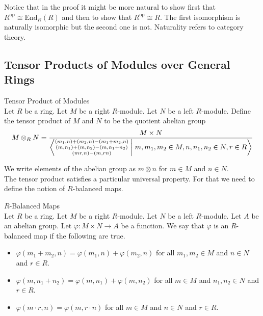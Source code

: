 \documentclass[a4paper]{article}
\begin{document}
Notice that in the proof it might be more natural to show first that $R^\text{op}\cong\text{End}_R(R)$ and then to show that $R^\text{op}\cong R$. The first isomorphism is naturally isomorphic but the second one is not. Naturality refers to category theory. 

\subsection{Tensor Products of Modules over General Rings}
\begin{defn}{Tensor Product of Modules}{}\\
Let $R$ be a ring. Let $M$ be a right $R$-module. Let $N$ be a left $R$-module. Define the tensor product of $M$ and $N$ to be the quotient abelian group $$M\otimes_RN=\frac{M\times N}{\left\langle\substack{(m_1,n)+(m_2,n)-(m_1+m_2,n)\\(m,n_1)+(m,n_2)-(m,n_1+n_2)\\(mr,n)-(m,rn)}\;\bigg{|}\;m,m_1,m_2\in M,n,n_1,n_2\in N,r\in R\right\rangle}$$
\end{defn}

We write elements of the abelian group as $m\otimes n$ for $m\in M$ and $n\in N$. \\

The tensor product satisfies a particular universal property. For that we need to define the notion of $R$-balanced maps. 

\begin{defn}{$R$-Balanced Maps}{}\\
Let $R$ be a ring. Let $M$ be a right $R$-module. Let $N$ be a left $R$-module. Let $A$ be an abelian group. Let $\varphi:M\times N\to A$ be a function. We say that $\varphi$ is an $R$-balanced map if the following are true. 
\begin{itemize}
\item $\varphi(m_1+m_2,n)=\varphi(m_1,n)+\varphi(m_2,n)$ for all $m_1,m_2\in M$ and $n\in N$ and $r\in R$. 
\item $\varphi(m,n_1+n_2)=\varphi(m,n_1)+\varphi(m,n_2)$ for all $m\in M$ and $n_1,n_2\in N$ and $r\in R$. 
\item $\varphi(m\cdot r,n)=\varphi(m,r\cdot n)$ for all $m\in M$ and $n\in N$ and $r\in R$. 
\end{itemize}
\end{defn}
\end{document}
